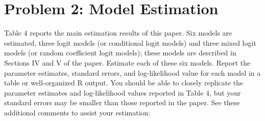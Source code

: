 \documentclass[11pt,letterpaper]{article}
\begin{document}
\section*{Problem 2: Model Estimation}

Table 4 reports the main estimation results of this paper. Six models are estimated, three logit models (or conditional logit models) and three mixed logit models (or random coefficient logit models); these models are described in Sections IV and V of the paper. Estimate each of these six models. Report the parameter estimates, standard errors, and log-likelihood value for each model in a table or well-organized R output. You should be able to closely replicate the parameter estimates and log-likelihood values reported in Table 4, but your standard errors may be smaller than those reported in the paper. See these additional comments to assist your estimation:
\end{document}
